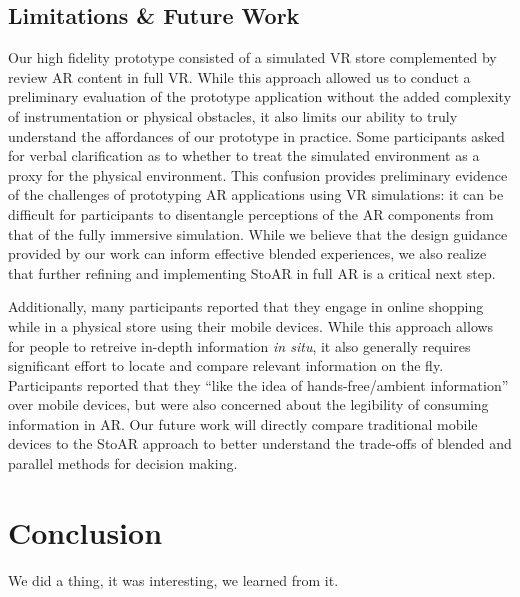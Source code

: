 \subsection{Limitations \& Future Work}
Our high fidelity prototype consisted of a simulated VR store complemented by review AR content in full VR.  While this approach allowed us to conduct a preliminary evaluation of the prototype application without the added complexity of instrumentation or physical obstacles, it also limits our ability to truly understand the affordances of our prototype in practice.  Some participants asked for verbal clarification as to whether to treat the simulated environment as a proxy for the physical environment. This confusion provides preliminary evidence of the challenges of prototyping AR applications using VR simulations: it can be difficult for participants to disentangle perceptions of the AR components from that of the fully immersive simulation. While we believe that the design guidance provided by our work can inform effective blended experiences, we also realize that further refining and implementing StoAR in full AR is a critical next step. 

Additionally, many participants reported that they engage in online shopping while in a physical store using their mobile devices. While this approach allows for people to retreive in-depth information \emph{in situ}, it also generally requires significant effort to locate and compare relevant information on the fly. Participants reported that they ``like the idea of hands-free/ambient information'' over mobile devices, but were also concerned about the legibility of consuming information in AR. Our future work will directly compare traditional mobile devices to the StoAR approach to better understand the trade-offs of blended and parallel methods for decision making. 

\section{Conclusion}
We did a thing, it was interesting, we learned from it.